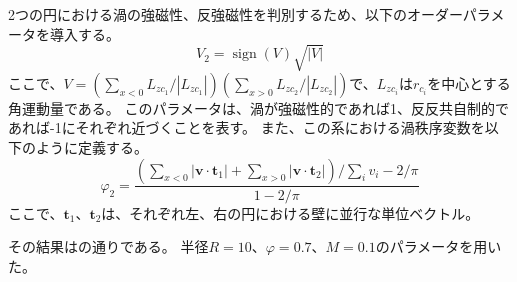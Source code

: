 \documentclass[/Users/ikedahajime/GitHub/reserch/master_report/thesis]{subfiles}
\begin{document}
2つの円における渦の強磁性、反強磁性を判別するため、以下のオーダーパラメータを導入する。
\begin{equation}
    V_2={\mathop{\mathrm{sign}}\nolimits} (V)\sqrt{|V|}
\end{equation}
ここで、$V=(\sum_{x<0} L_{zc_1}/|L_{zc_1}|)(\sum_{x>0}L_{zc_2}/|L_{zc_2}|)$で、$L_{zc_i}$は$r_{c_i}$を中心とする角運動量である。
このパラメータは、渦が強磁性的であれば1、反反共自制的であれば-1にそれぞれ近づくことを表す。
また、この系における渦秩序変数を以下のように定義する。
\begin{equation}
    \varphi_2=\frac{(\sum_{x<0} \left|\bm{v}\cdot \bm{t}_{1} \right|+\sum_{x>0} \left|\bm{v}\cdot \bm{t}_{2} \right|)/\sum_i v_i -2/\pi}{1-2/\pi}
\end{equation}
ここで、$\bm{t}_1、\bm{t}_2$は、それぞれ左、右の円における壁に並行な単位ベクトル。


その結果はの通りである。
半径$R=10$、$\varphi=0.7、M=0.1$のパラメータを用いた。
\end{document}
